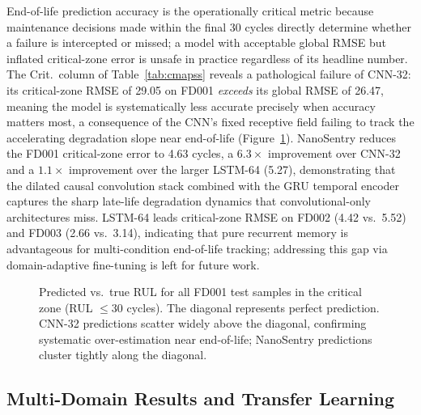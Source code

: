 \documentclass[AMA,Times1COL]{WileyNJDv5}
\begin{document}
End-of-life prediction accuracy is the operationally critical metric
because maintenance decisions made within the final 30 cycles
directly determine whether a failure is intercepted or missed; a model
with acceptable global RMSE but inflated critical-zone error is unsafe
in practice regardless of its headline number.
The Crit.\ column of Table~\ref{tab:cmapss} reveals a pathological
failure of CNN-32: its critical-zone RMSE of 29.05 on FD001
\emph{exceeds} its global RMSE of 26.47, meaning the model is
systematically less accurate precisely when accuracy matters most,
a consequence of the CNN's fixed receptive field failing to track the
accelerating degradation slope near end-of-life
(Figure~\ref{fig:critical}).
NanoSentry reduces the FD001 critical-zone error to 4.63 cycles, a
$6.3{\times}$ improvement over CNN-32 and a $1.1{\times}$ improvement
over the larger LSTM-64 (5.27), demonstrating that the dilated
causal convolution stack combined with the GRU temporal encoder
captures the sharp late-life degradation dynamics that
convolutional-only architectures miss.
LSTM-64 leads critical-zone RMSE on FD002 (4.42 vs.\ 5.52) and FD003
(2.66 vs.\ 3.14), indicating that pure recurrent memory is
advantageous for multi-condition end-of-life tracking; addressing this
gap via domain-adaptive fine-tuning is left for future work.

\begin{figure}[!t]
  \centering
  \caption{Predicted vs.\ true RUL for all FD001 test samples
    in the critical zone (RUL $\leq 30$ cycles). The diagonal
    represents perfect prediction. CNN-32 predictions scatter
    widely above the diagonal, confirming systematic
    over-estimation near end-of-life; NanoSentry predictions
    cluster tightly along the diagonal.}
  \label{fig:critical}
\end{figure}

\subsection{Multi-Domain Results and Transfer Learning}
\label{sec:results:multidomain}
\end{document}
